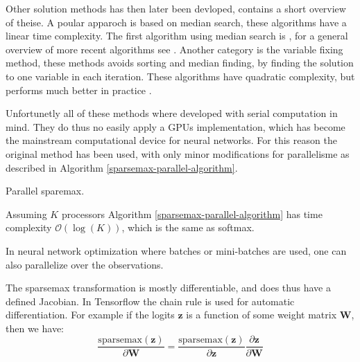 Other solution methods has then later been devloped, \cite{Liu2016} contains a short overview of theise. A poular apparoch is based on median search, these algorithms have a linear time complexity. The first algorithm using median search is \cite{brucker1984a}, for a general overview of more recent algorithms see \cite{kiwiel2008a-median}. Another category is the variable fixing method, these methods avoids sorting and median finding, by finding the solution to one variable in each iteration. These algorithms have quadratic complexity, but performs much better in practice \cite{kiwiel2008a-fixing}.

Unfortunetly all of these methods where developed with serial computation in mind. They do thus no easily apply a GPUs implementation, which has become the mainstream computational device for neural networks. For this reason the original method \cite{Helgason1980} has been used, with only minor modifications for parallelisme as described in Algorithm \ref{sparsemax-parallel-algorithm}.

\begin{algorithm}[H]
  \caption{Parallel sparemax.}
  \begin{algorithmic}[1]
       
       
       
      \State {}
    \EndFunction
  \end{algorithmic}
  \label{sparsemax-parallel-algorithm}
\end{algorithm}

Assuming $K$ processors Algorithm \ref{sparsemax-parallel-algorithm} has time complexity $\mathcal{O}(\log(K))$, which is the same as softmax.

In neural network optimization where batches or mini-batches are used, one can also parallelize over the observations.

The sparsemax transformation is mostly differentiable, and does thus have a defined Jacobian. In Tensorflow \cite{tensorflow2015-whitepaper} the chain rule is used for automatic differentiation. For example if the logits $\mathbf{z}$ is a function of some weight matrix $\mathbf{W}$, then we have:
\begin{equation}
\frac{\mathrm{sparsemax}(\mathbf{z})}{\partial \mathbf{W}} = \frac{\mathrm{sparsemax}(\mathbf{z})}{\partial \mathbf{z}} \frac{\partial \mathbf{z}}{\partial \mathbf{W}}
\end{equation}

